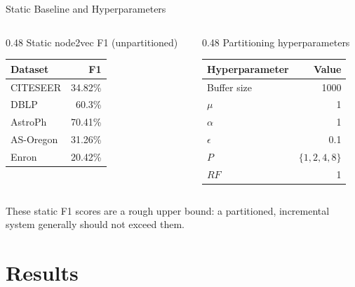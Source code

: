 \documentclass[aspectratio=169]{beamer}
\begin{document}
\begin{frame}{Static Baseline and Hyperparameters}
  \begin{columns}
    \begin{column}{0.48\textwidth}
      \centering
      \small Static node2vec F1 (unpartitioned)
      \begin{tabular}{lr}
        \toprule
        Dataset & F1 \\
        \midrule
        CITESEER   & 34.82\% \\
        DBLP       & 60.3\%  \\
        AstroPh    & 70.41\% \\
        AS-Oregon  & 31.26\% \\
        Enron      & 20.42\% \\
        \bottomrule
      \end{tabular}
    \end{column}
    \begin{column}{0.48\textwidth}
      \centering
      \small Partitioning hyperparameters
      \begin{tabular}{lr}
        \toprule
        Hyperparameter & Value \\
        \midrule
        Buffer size & 1000 \\
        $\mu$       & 1 \\
        $\alpha$    & 1 \\
        $\epsilon$  & 0.1 \\
        $P$         & $\{1,2,4,8\}$ \\
        $RF$        & 1 \\
        \bottomrule
      \end{tabular}
    \end{column}
  \end{columns}
  \vspace{1em}
  These static F1 scores are a rough upper bound: a partitioned, incremental system generally should not exceed them.
\end{frame}

\section{Results}
\end{document}
